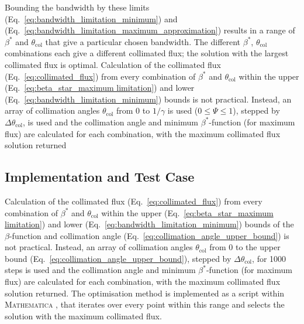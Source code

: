 \documentclass[../main.tex]{subfiles}
\begin{document}
Bounding the bandwidth by these limits (Eq.~\ref{eq:bandwidth_limitation_minimum}) and  (Eq.~\ref{eq:bandwidth_limitation_maximum_approximation}) results in a range of $\beta^{*}$ and $\theta_{\mathrm{col}}$ that give a particular chosen bandwidth. The different $\beta^{*}$, $\theta_{\mathrm{col}}$ combinations each give a different collimated flux; the solution with the largest collimated flux is optimal. Calculation of the collimated flux (Eq.~\ref{eq:collimated_flux}) from every combination of $\beta^{*}$ and $\theta_{\mathrm{col}}$ within the upper (Eq.~\ref{eq:beta_star_maximum limitation}) and lower (Eq.~\ref{eq:bandwidth_limitation_minimum}) bounds is not practical. Instead, an array of collimation angles $\theta_{\mathrm{col}}$ from 0 to $1/\gamma$ is used ($0\leq\Psi\leq1$), stepped by $\Delta\theta_{\mathrm{col}}$, is used and the collimation angle and minimum $\beta^{*}$-function (for maximum flux) are calculated for each combination, with the maximum collimated flux solution returned 
\subsection{Implementation and Test Case}

Calculation of the collimated flux (Eq.~\ref{eq:collimated_flux}) from every combination of $\beta^{*}$ and $\theta_{\mathrm{col}}$ within the upper (Eq.~\ref{eq:beta_star_maximum limitation}) and lower (Eq.~\ref{eq:bandwidth_limitation_minimum}) bounds of the $\beta$-function and collimation angle (Eq.~\ref{eq:collimation_angle_upper_bound}) is not practical. Instead, an array of collimation angles $\theta_{\mathrm{col}}$ from 0 to the upper bound (Eq.~\ref{eq:collimation_angle_upper_bound}), stepped by $\Delta\theta_{\mathrm{col}}$, for 1000 steps is used and the collimation angle and minimum $\beta^{*}$-function (for maximum flux) are calculated for each combination, with the maximum collimated flux solution returned. The optimisation method is implemented as a script within \textsc{Mathematica} \cite{wolfram2021nmaximize}, that iterates over every point within this range and selects the solution with the maximum collimated flux. 
\end{document}

